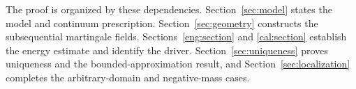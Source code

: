 The proof is organized by these dependencies. Section~\ref{sec:model}
states the model and continuum prescription.
Section~\ref{sec:geometry} constructs the subsequential martingale
fields. Sections~\ref{eng:section} and \ref{cal:section} establish the
energy estimate and identify the driver. Section~\ref{sec:uniqueness} proves uniqueness and the
bounded-approximation result, and
Section~\ref{sec:localization} completes the arbitrary-domain
and negative-mass cases.
